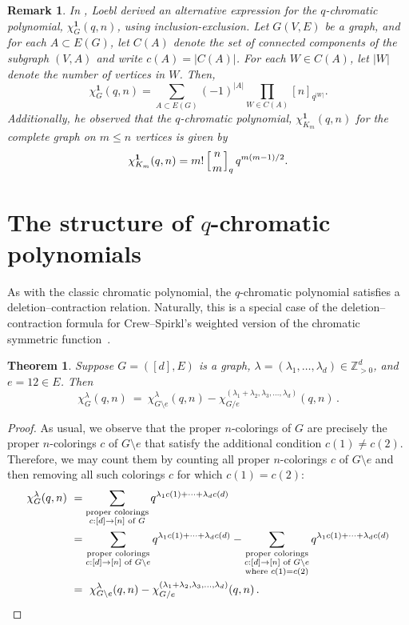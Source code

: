 \documentclass[11pt]{amsart}
\newtheorem{theorem}{Theorem} %
\newtheorem{rem}{Remark}
\newenvironment{remark}{\begin{rem}\sf}{\end{rem}}
\newcommand\ZZ{\mathbb{Z}}
\newcommand\bone{\mathbf{1}}
\begin{document}
\begin{remark}\label{rem:loebl}
In \cite[Theorem 1]{loebl}, Loebl derived an alternative expression for the $q$-chromatic polynomial, $\chi^\bone_G(q,n)$, using inclusion-exclusion.
Let $G(V,E)$ be a graph, and for each  $A\subset E(G)$, let $C(A)$ denote the set of connected components of the subgraph $(V,A)$ and write $c(A)=|C(A)|$. For each $W\in C(A)$, let $|W|$ denote the number of vertices in $W$. 
Then, 
\[\chi^\bone_G(q,n) = \sum_{A\subset E(G)}(-1)^{|A|} \prod_{W\in C(A)} [n]_{q^{|W|}}.\]
Additionally, he observed that the $q$-chromatic polynomial, $\chi^\bone_{K_m}(q,n)$ for the complete graph on $m\leq n$ vertices is given by 
\[\chi^\bone_{K_m}(q,n)=m! \left[ n \atop m \right]_q q^{m(m-1)/2}.\]


\end{remark}


\section{The structure of $q$-chromatic polynomials}\label{sec:structure}

As with the classic chromatic polynomial, the $q$-chromatic polynomial satisfies a
deletion--contraction relation. Naturally, this is a special case of the deletion--contraction formula for Crew--Spirkl's  weighted version of the chromatic symmetric function~\cite[Lemma~2]{crewspirkl}.

\begin{theorem}\label{thm:deletion-contraction}
Suppose $G=([d],E)$ is a graph, $\lambda=(\lambda_1,\hdots,\lambda_d)\in\ZZ_{>0}^d$, and $e=12\in E$. Then 
\[
\chi_G^\lambda(q,n) \ = \ \chi_{G\setminus e}^\lambda(q,n)-\chi_{G/e}^{(\lambda_1+\lambda_2,\lambda_3,\hdots,\lambda_d)}(q,n) \, .
\]
\end{theorem}

\begin{proof}
As usual, we observe that the proper $n$-colorings of $G$ are precisely the proper $n$-colorings $c$ of $G\setminus e$ that satisfy the additional condition $c(1)\neq c(2)$. 
Therefore, we may count them by counting all proper $n$-colorings $c$ of $G\setminus e$ and then removing all such colorings $c$ for which $c(1)=c(2)$:
\begin{align*}
\chi_G^\lambda(q,n) \ &=\sum_{\substack{\text{proper colorings}\\ c:[d]\to [n]\text{ of }G}} q^{\lambda_1c(1)+\cdots+\lambda_dc(d)}\\
&=\sum_{\substack{\text{proper colorings}\\ c:[d]\to [n]\text{ of }G\setminus e}} q^{\lambda_1c(1)+\cdots+\lambda_dc(d)}-\sum_{\substack{\text{proper colorings}\\ c:[d]\to [n]\text{ of }G\setminus e\\ \text{where }c(1)=c(2)}} q^{\lambda_1c(1)+\cdots+\lambda_dc(d)}\\
&= \ \chi_{G\setminus e}^\lambda(q,n)-\chi_{G/e}^{(\lambda_1+\lambda_2,\lambda_3,\hdots,\lambda_d)}(q,n)
\, . \qedhere
\end{align*}
\end{proof}
\end{document}
